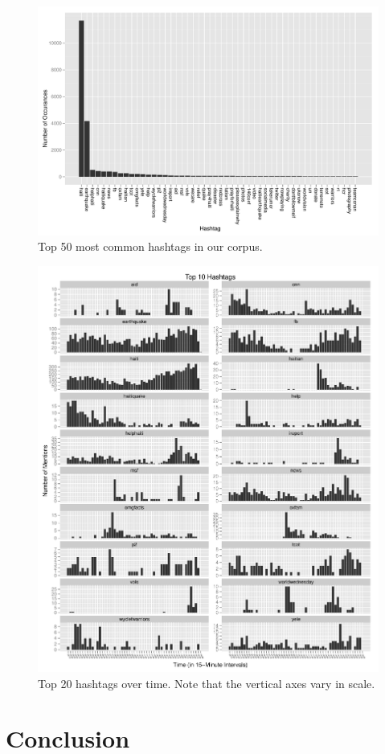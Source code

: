 \documentclass[a4paper, 11pt, titlepage]{article}
\begin{document}
\begin{figure}[h]
\centering
\label{fig:hashtag_counts}
\includegraphics[width=\textwidth]{../figures/hashtag_counts.pdf}
\caption{Top 50 most common hashtags in our corpus.}
\end{figure}


\begin{figure}[h]
\centering
\label{fig:hashtag_counts}
\includegraphics[width=\textwidth]{../figures/top-20-hashtags.pdf}
\caption{Top 20 hashtags over time. Note that the vertical axes vary in scale.}
\end{figure}
\section{Conclusion}



\end{document}
